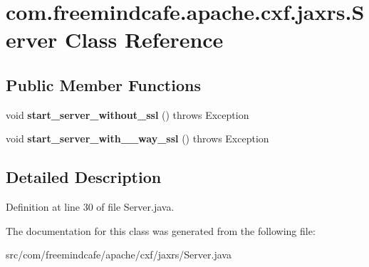 \hypertarget{classcom_1_1freemindcafe_1_1apache_1_1cxf_1_1jaxrs_1_1_server}{}\section{com.\+freemindcafe.\+apache.\+cxf.\+jaxrs.\+Server Class Reference}
\label{classcom_1_1freemindcafe_1_1apache_1_1cxf_1_1jaxrs_1_1_server}
\subsection*{Public Member Functions}
\begin{DoxyCompactItemize}
\item 
\hypertarget{classcom_1_1freemindcafe_1_1apache_1_1cxf_1_1jaxrs_1_1_server_abffd33b1295218b8c29973a69573546c}{}void {\bfseries start\+\_\+server\+\_\+without\+\_\+ssl} ()  throws Exception\label{classcom_1_1freemindcafe_1_1apache_1_1cxf_1_1jaxrs_1_1_server_abffd33b1295218b8c29973a69573546c}

\item 
\hypertarget{classcom_1_1freemindcafe_1_1apache_1_1cxf_1_1jaxrs_1_1_server_a65f126fe40293e5d976677a991d9ba9e}{}void {\bfseries start\+\_\+server\+\_\+with\+\_\+\_\+way\+\_\+ssl} ()  throws Exception\label{classcom_1_1freemindcafe_1_1apache_1_1cxf_1_1jaxrs_1_1_server_a65f126fe40293e5d976677a991d9ba9e}

\end{DoxyCompactItemize}


\subsection{Detailed Description}


Definition at line 30 of file Server.\+java.



The documentation for this class was generated from the following file\+:\begin{DoxyCompactItemize}
\item 
src/com/freemindcafe/apache/cxf/jaxrs/Server.\+java\end{DoxyCompactItemize}
